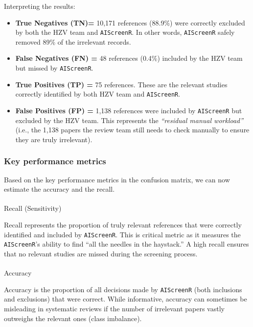 \documentclass[
  letterpaper,
  DIV=11,
  numbers=noendperiod]{scrartcl}
\makeatletter
\let\oldparagraph\paragraph
\renewcommand{\paragraph}{
    \@ifstar
      \xxxParagraphStar
      \xxxParagraphNoStar
  }
\newcommand{\xxxParagraphStar}[1]{\oldparagraph*{#1}\mbox{}}
\newcommand{\xxxParagraphNoStar}[1]{\oldparagraph{#1}\mbox{}}
\makeatother
\begin{document}
Interpreting the results:

\begin{itemize}
\item
  \textbf{True Negatives (TN)=} 10,171 references (88.9\%) were
  correctly excluded by both the HZV team and \texttt{AIScreenR}. In
  other words, \texttt{AIScreenR} safely removed 89\% of the irrelevant
  records.
\item
  \textbf{False Negatives (FN) =} 48 references (0.4\%) included by the
  HZV team but missed by \texttt{AIScreenR}.
\item
  \textbf{True Positives (TP) =} 75 references. These are the relevant
  studies correctly identified by both HZV team and \texttt{AIScreenR}.
\item
  \textbf{False Positives (FP) =} 1,138 references were included by
  \texttt{AIScreenR} but excluded by the HZV team. This represents the
  \emph{``residual manual workload''} (i.e., the 1,138 papers the review
  team still needs to check manually to ensure they are truly
  irrelevant).
\end{itemize}

\subsubsection{Key performance metrics}\label{key-performance-metrics}

Based on the key performance metrics in the confusion matrix, we can now
estimate the accuracy and the recall.

\paragraph{Recall (Sensitivity)}\label{recall-sensitivity}

Recall represents the proportion of truly relevant references that were
correctly identified and included by \texttt{AIScreenR}. This is
critical metric as it measures the \texttt{AIScreenR}'s ability to find
``all the needles in the haystack.'' A high recall ensures that no
relevant studies are missed during the screening process.

\paragraph{Accuracy}\label{accuracy}

Accuracy is the proportion of all decisions made by \texttt{AIScreenR}
(both inclusions and exclusions) that were correct. While informative,
accuracy can sometimes be misleading in systematic reviews if the number
of irrelevant papers vastly outweighs the relevant ones (class
imbalance).
\end{document}
